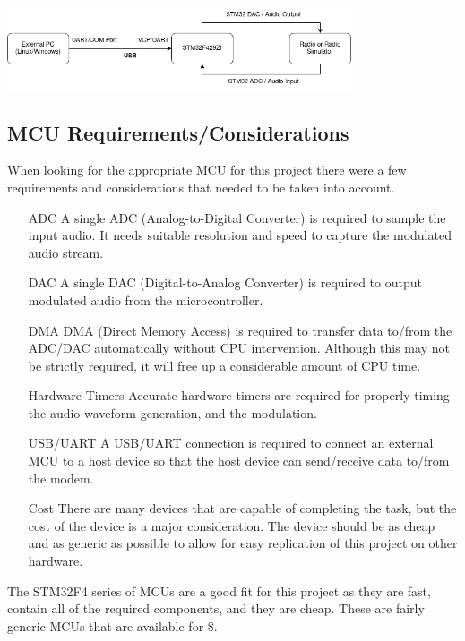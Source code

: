 \documentclass[notitlepage]{report}
\begin{document}
\includegraphics[width=4in]{images/hardware_outline}

\begin{center}
\subsection{MCU Requirements/Considerations}
\end{center}

When looking for the appropriate MCU for this project there were a few requirements and considerations that needed to be taken into account.

\begin{itemize}
  \item[ADC] A single ADC (Analog-to-Digital Converter) is required to sample the input audio. It needs suitable resolution and speed to capture the modulated audio stream.
  \item[DAC] A single DAC (Digital-to-Analog Converter) is required to output modulated audio from the microcontroller.
  \item[DMA] DMA (Direct Memory Access) is required to transfer data to/from the ADC/DAC automatically without CPU intervention. Although this may not be strictly required, it will free up a considerable amount of CPU time.
  \item[Hardware Timers] Accurate hardware timers are required for properly timing the audio waveform generation, and the modulation.
  \item[USB/UART] A USB/UART connection is required to connect an external MCU to a host device so that the host device can send/receive data to/from the modem.
  \item[Cost] There are many devices that are capable of completing the task, but the cost of the device is a major consideration. The device should be as cheap and as generic as possible to allow for easy replication of this project on other hardware.
\end{itemize}

The STM32F4 series of MCUs are a good fit for this project as they are fast, contain all of the required components, and they are cheap. These are fairly generic MCUs that are available for \$.
\end{document}
